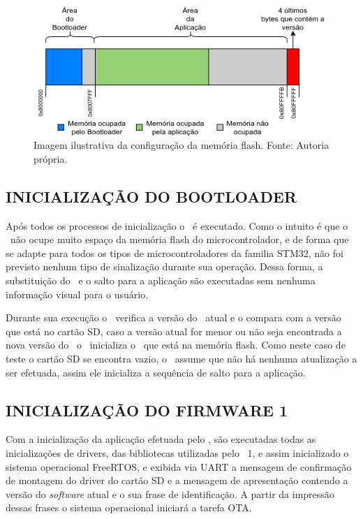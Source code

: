 \begin{figure}[H]
    \scriptsize
     \centering
     \includegraphics[scale=0.9]{dados/figuras/flash_ocupation.png}
     \caption{Imagem ilustrativa da configuração da memória flash. \newline Fonte: Autoria própria.}
     \label{memoriaflash}
\end{figure}

\subsection{INICIALIZAÇÃO DO BOOTLOADER}
Após todos os processos de inicialização o \bootloader\ é executado. Como o intuito é que o \bootloader\ não ocupe muito espaço da memória flash do microcontrolador, e de forma que se adapte para todos os tipos de microcontroladores da familia STM32, não foi previsto nenhum tipo de sinalização durante sua operação. Dessa forma, a substituição do \firmware\ e o salto para a aplicação são executadas sem nenhuma informação visual para o usuário.

Durante sua execução o \bootloader\ verifica a versão do \firmware\ atual e o compara com a versão que está no cartão SD, caso a versão atual for menor ou não seja encontrada a nova versão do \firmware\, o \bootloader\ inicializa o \firmware\ que está na memória flash. Como neste caso de teste o cartão SD se encontra vazio, o \bootloader\ assume que não há nenhuma atualização a ser efetuada, assim ele inicializa a sequência de salto para a aplicação. 

\subsection{INICIALIZAÇÃO DO FIRMWARE 1}
Com a inicialização da aplicação efetuada pelo \bootloader, são executadas todas as inicializações de drivers, das bibliotecas utilizadas pelo \firmware\ 1, e assim inicializado o sistema operacional FreeRTOS, e exibida via UART a mensagem de confirmação de montagem do driver do cartão SD e a mensagem de apresentação contendo a versão do \textit{software} atual e o sua frase de identificação. A partir da impressão dessas frases o sistema operacional iniciará a tarefa OTA.

